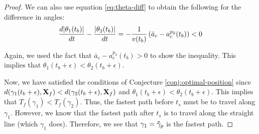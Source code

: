 \begin{proof}
We can also use equation \ref{eq:theta-diff} to obtain the following for the difference in angles:
\begin{eqnarray}
  \frac{d \abs{\theta_1(t_b)}}{dt} - \frac{\abs{\theta_2 (t_b)}}{dt} = - \frac{1}{v(t_b)} \left(\bar{a}_c - a^{p_2}_c(t_b) \right) < 0
\end{eqnarray}

Again, we used the fact that $\bar{a}_c - a^{p_2}_c(t_b) > 0$ to show the inequality. This implies that $\theta_1(t_b + \epsilon) < \theta_2(t_b + \epsilon)$.

Now, we have satisfied the conditions of Conjecture \ref{conj:optimal-position} since $d(\gamma_1(t_b + \epsilon), \mathbf{X}_f) < d(\gamma_2(t_b + \epsilon), \mathbf{X}_f)$ and $\theta_1(t_b + \epsilon) < \theta_2(t_b + \epsilon)$. This implies that $T_f(\gamma_1) < T_f(\gamma_2)$. Thus, the fastest path before $t_s$ must be to travel along $\gamma_1$. However, we know that the fastest path after $t_s$ is to travel along the straight line (which $\gamma_1$ does). Therefore, we see that $\gamma_1 = \mathbf{\hat{\gamma}}_p$ is the fastest path.
\end{proof}